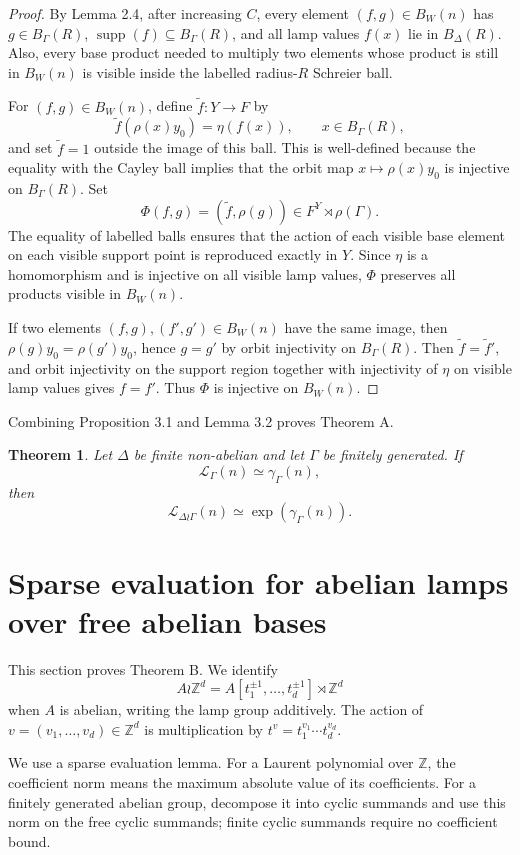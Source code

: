 \documentclass[11pt]{article}
\newcommand{\LEF}{\mathcal L}
\newcommand{\Z}{\mathbb Z}
\newcommand{\supp}{\operatorname{supp}}
\newtheorem{theorem}{Theorem}[section]
\begin{document}
\begin{proof}
By Lemma 2.4, after increasing \(C\), every element \((f,g)\in B_W(n)\) has \(g\in B_\Gamma(R)\), \(\supp(f)\subseteq B_\Gamma(R)\), and all lamp values \(f(x)\) lie in \(B_\Delta(R)\). Also, every base product needed to multiply two elements whose product is still in \(B_W(n)\) is visible inside the labelled radius-\(R\) Schreier ball.

For \((f,g)\in B_W(n)\), define \(\tilde f:Y\to F\) by
\[
\tilde f(\rho(x)y_0)=\eta(f(x)),\qquad x\in B_\Gamma(R),
\]
and set \(\tilde f=1\) outside the image of this ball. This is well-defined because the equality with the Cayley ball implies that the orbit map \(x\mapsto \rho(x)y_0\) is injective on \(B_\Gamma(R)\). Set
\[
\Phi(f,g)=(\tilde f,\rho(g))\in F^Y\rtimes\rho(\Gamma).
\]
The equality of labelled balls ensures that the action of each visible base element on each visible support point is reproduced exactly in \(Y\). Since \(\eta\) is a homomorphism and is injective on all visible lamp values, \(\Phi\) preserves all products visible in \(B_W(n)\).

If two elements \((f,g),(f',g')\in B_W(n)\) have the same image, then \(\rho(g)y_0=\rho(g')y_0\), hence \(g=g'\) by orbit injectivity on \(B_\Gamma(R)\). Then \(\tilde f=\tilde f'\), and orbit injectivity on the support region together with injectivity of \(\eta\) on visible lamp values gives \(f=f'\). Thus \(\Phi\) is injective on \(B_W(n)\).
\end{proof}

Combining Proposition 3.1 and Lemma 3.2 proves Theorem A.

\begin{theorem}
Let \(\Delta\) be finite non-abelian and let \(\Gamma\) be finitely generated. If
\[
\LEF_\Gamma(n)\simeq\gamma_\Gamma(n),
\]
then
\[
\LEF_{\Delta\wr\Gamma}(n)\simeq \exp(\gamma_\Gamma(n)).
\]
\end{theorem}

\section{Sparse evaluation for abelian lamps over free abelian bases}

This section proves Theorem B. We identify
\[
A\wr\Z^d=A[t_1^{\pm 1},\ldots,t_d^{\pm 1}]\rtimes \Z^d
\]
when \(A\) is abelian, writing the lamp group additively. The action of \(v=(v_1,\ldots,v_d)\in\Z^d\) is multiplication by \(t^v=t_1^{v_1}\cdots t_d^{v_d}\).

We use a sparse evaluation lemma. For a Laurent polynomial over \(\Z\), the coefficient norm means the maximum absolute value of its coefficients. For a finitely generated abelian group, decompose it into cyclic summands and use this norm on the free cyclic summands; finite cyclic summands require no coefficient bound.
\end{document}
